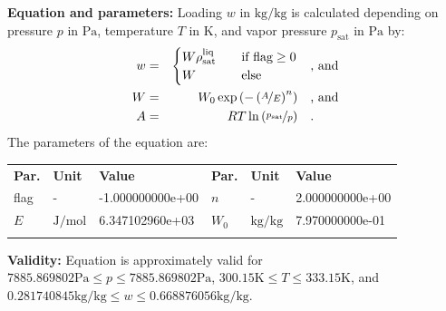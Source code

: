\textbf{Equation and parameters:}
\newline
%
Loading $w$ in $\si{\kilogram\per\kilogram}$ is calculated depending on pressure $p$ in $\si{\pascal}$, temperature $T$ in $\si{\kelvin}$, and vapor pressure $p_\mathrm{sat}$ in $\si{\pascal}$ by:
%
\begin{equation*}
\begin{split}
w &=& \begin{cases} W \rho_\mathrm{sat}^{\mathrm{liq}} & \quad \text{if flag} \geq 0 \\ W & \quad \text{else} \end{cases} & \quad\text{, and} \\
W &=& W_0 \exp \left( - \left( \nicefrac{A}{E} \right) ^{n} \right) & \quad\text{, and} \\
A &=& R T \ln \left( \nicefrac{p_\mathrm{sat}}{p} \right) & \quad\text{.} \\
\end{split}
\end{equation*}
%
The parameters of the equation are:
%
\begin{longtable}[l]{lll|lll}
\toprule
\addlinespace
\textbf{Par.} & \textbf{Unit} & \textbf{Value} &	\textbf{Par.} & \textbf{Unit} & \textbf{Value} \\
\addlinespace
\midrule
\endhead

\bottomrule
\endfoot
\bottomrule
\endlastfoot
\addlinespace

flag & - & -1.000000000e+00 & $n$ & - & 2.000000000e+00 \\
$E$ & $\si{\joule\per\mole}$ & 6.347102960e+03 & $W_0$ & $\si{\kilogram\per\kilogram}$ & 7.970000000e-01 \\

\addlinespace\end{longtable}

\textbf{Validity:}
\newline
Equation is approximately valid for $7885.869802 \si{\pascal} \leq p \leq 7885.869802 \si{\pascal}$,  $300.15 \si{\kelvin} \leq T \leq 333.15 \si{\kelvin}$, and $0.281740845 \si{\kilogram\per\kilogram} \leq w \leq 0.668876056 \si{\kilogram\per\kilogram}$.
\newline

